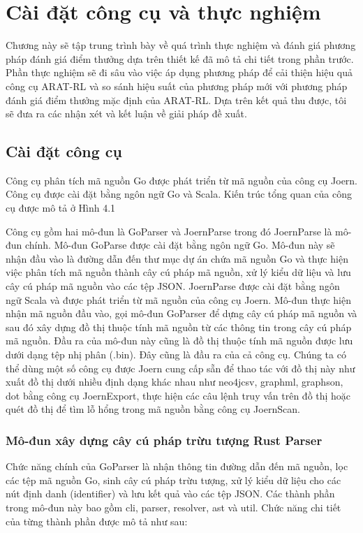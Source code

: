 \chapter{Cài đặt công cụ và thực nghiệm}
\label{chap:experiment}

Chương này sẽ tập trung trình bày về quá trình thực nghiệm và đánh giá phương pháp đánh giá điểm thưởng dựa trên thiết kế đã mô tả chi tiết trong phần trước. Phần thực nghiệm sẽ đi sâu vào việc áp dụng phương pháp để cải thiện hiệu quả công cụ ARAT-RL và so sánh hiệu suất của phương pháp mới với phương pháp đánh giá điểm thưởng mặc định của ARAT-RL. Dựa trên kết quả thu được, tôi sẽ đưa ra các nhận xét và kết luận về giải pháp đề xuất.

\section{Cài đặt công cụ}

Công cụ phân tích mã nguồn Go được phát triển từ mã nguồn của công cụ Joern.
Công cụ được cài đặt bằng ngôn ngữ Go và Scala. Kiến trúc tổng quan của công cụ được
mô tả ở Hình 4.1

Công cụ gồm hai mô-đun là GoParser và JoernParse trong đó JoernParse là mô-đun
chính. Mô-đun GoParse được cài đặt bằng ngôn ngữ Go. Mô-đun này sẽ nhận đầu vào là
đường dẫn đến thư mục dự án chứa mã nguồn Go và thực hiện việc phân tích mã nguồn
thành cây cú pháp mã nguồn, xử lý kiểu dữ liệu và lưu cây cú pháp mã nguồn vào các
tệp JSON. JoernParse được cài đặt bằng ngôn ngữ Scala và được phát triển từ mã nguồn
của công cụ Joern. Mô-đun thực hiện nhận mã nguồn đầu vào, gọi mô-đun GoParser để
dựng cây cú pháp mã nguồn và sau đó xây dựng đồ thị thuộc tính mã nguồn từ các thông
tin trong cây cú pháp mã nguồn. Đầu ra của mô-đun này cũng là đồ thị thuộc tính mã
nguồn được lưu dưới dạng tệp nhị phân (.bin). Đây cũng là đầu ra của cả công cụ. Chúng
ta có thể dùng một số công cụ được Joern cung cấp sẵn để thao tác với đồ thị này như xuất đồ thị dưới nhiều định dạng khác nhau như neo4jcsv, graphml, graphson, dot bằng
công cụ JoernExport, thực hiện các câu lệnh truy vấn trên đồ thị hoặc quét đồ thị để tìm
lỗ hổng trong mã nguồn bằng công cụ JoernScan.

\subsection{Mô-đun xây dựng cây cú pháp trừu tượng Rust Parser}

Chức năng chính của GoParser là nhận thông tin đường dẫn đến mã nguồn, lọc các
tệp mã nguồn Go, sinh cây cú pháp trừu tượng, xử lý kiểu dữ liệu cho các nút định danh
(identifier) và lưu kết quả vào các tệp JSON. Các thành phần trong mô-đun này bao gồm
cli, parser, resolver, ast và util. Chức năng chi tiết của từng thành phần được mô tả như
sau:

